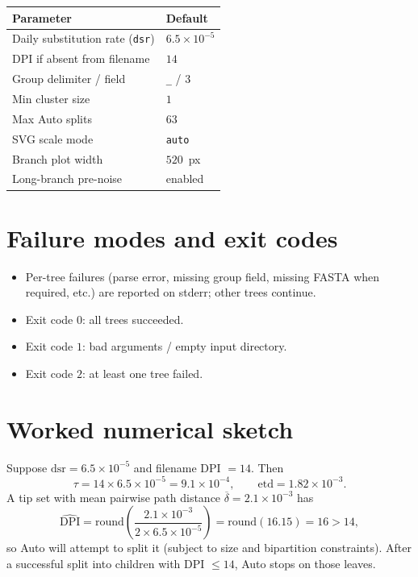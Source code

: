 \documentclass[11pt,a4paper]{article}
\begin{document}
\begin{center}
\begin{tabular}{@{}ll@{}}
\toprule
Parameter & Default \\
\midrule
Daily substitution rate (\texttt{dsr}) & $6.5\times10^{-5}$ \\
DPI if absent from filename & $14$ \\
Group delimiter / field & \texttt{\_} / $3$ \\
Min cluster size & $1$ \\
Max Auto splits & $63$ \\
SVG scale mode & \texttt{auto} \\
Branch plot width & $520$~px \\
Long-branch pre-noise & enabled \\
\bottomrule
\end{tabular}
\end{center}

\section{Failure modes and exit codes}

\begin{itemize}
  \item Per-tree failures (parse error, missing group field, missing FASTA when
        required, etc.) are reported on stderr; other trees continue.
  \item Exit code $0$: all trees succeeded.
  \item Exit code $1$: bad arguments / empty input directory.
  \item Exit code $2$: at least one tree failed.
\end{itemize}

\section{Worked numerical sketch}

Suppose $\mathrm{dsr}=6.5\times10^{-5}$ and filename DPI $=14$. Then
\[
  \tau=14\times6.5\times10^{-5}=9.1\times10^{-4},\qquad
  \mathrm{etd}=1.82\times10^{-3}.
\]
A tip set with mean pairwise path distance
$\overline{\delta}=2.1\times10^{-3}$ has
\[
  \widehat{\mathrm{DPI}}
  =\mathrm{round}\!\left(\frac{2.1\times10^{-3}}{2\times6.5\times10^{-5}}\right)
  =\mathrm{round}(16.15)=16>14,
\]
so Auto will attempt to split it (subject to size and bipartition constraints).
After a successful split into children with DPI $\le 14$, Auto stops on those
leaves.
\end{document}
